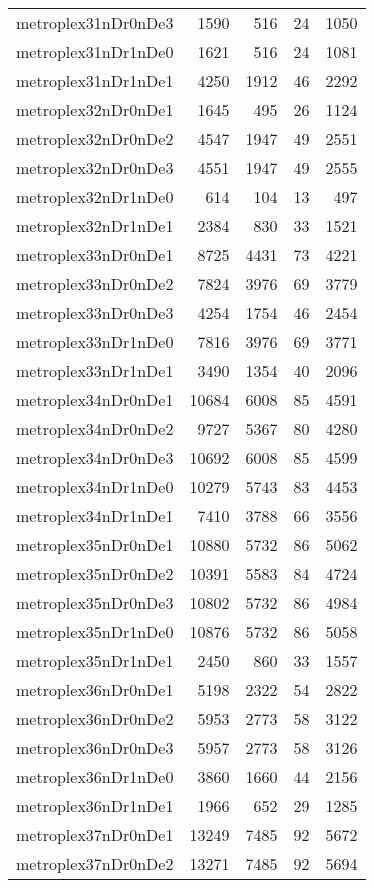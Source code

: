 \documentclass[../../../thesis.tex]{subfiles}
\begin{document}
\begin{longtable}{lrrrr}
metroplex31nDr0nDe3 & 1590 & 516 & 24 & 1050 \\
metroplex31nDr1nDe0 & 1621 & 516 & 24 & 1081 \\
metroplex31nDr1nDe1 & 4250 & 1912 & 46 & 2292 \\
metroplex32nDr0nDe1 & 1645 & 495 & 26 & 1124 \\
metroplex32nDr0nDe2 & 4547 & 1947 & 49 & 2551 \\
metroplex32nDr0nDe3 & 4551 & 1947 & 49 & 2555 \\
metroplex32nDr1nDe0 & 614 & 104 & 13 & 497 \\
metroplex32nDr1nDe1 & 2384 & 830 & 33 & 1521 \\
metroplex33nDr0nDe1 & 8725 & 4431 & 73 & 4221 \\
metroplex33nDr0nDe2 & 7824 & 3976 & 69 & 3779 \\
metroplex33nDr0nDe3 & 4254 & 1754 & 46 & 2454 \\
metroplex33nDr1nDe0 & 7816 & 3976 & 69 & 3771 \\
metroplex33nDr1nDe1 & 3490 & 1354 & 40 & 2096 \\
metroplex34nDr0nDe1 & 10684 & 6008 & 85 & 4591 \\
metroplex34nDr0nDe2 & 9727 & 5367 & 80 & 4280 \\
metroplex34nDr0nDe3 & 10692 & 6008 & 85 & 4599 \\
metroplex34nDr1nDe0 & 10279 & 5743 & 83 & 4453 \\
metroplex34nDr1nDe1 & 7410 & 3788 & 66 & 3556 \\
metroplex35nDr0nDe1 & 10880 & 5732 & 86 & 5062 \\
metroplex35nDr0nDe2 & 10391 & 5583 & 84 & 4724 \\
metroplex35nDr0nDe3 & 10802 & 5732 & 86 & 4984 \\
metroplex35nDr1nDe0 & 10876 & 5732 & 86 & 5058 \\
metroplex35nDr1nDe1 & 2450 & 860 & 33 & 1557 \\
metroplex36nDr0nDe1 & 5198 & 2322 & 54 & 2822 \\
metroplex36nDr0nDe2 & 5953 & 2773 & 58 & 3122 \\
metroplex36nDr0nDe3 & 5957 & 2773 & 58 & 3126 \\
metroplex36nDr1nDe0 & 3860 & 1660 & 44 & 2156 \\
metroplex36nDr1nDe1 & 1966 & 652 & 29 & 1285 \\
metroplex37nDr0nDe1 & 13249 & 7485 & 92 & 5672 \\
metroplex37nDr0nDe2 & 13271 & 7485 & 92 & 5694 \\

\end{longtable}
\end{document}

